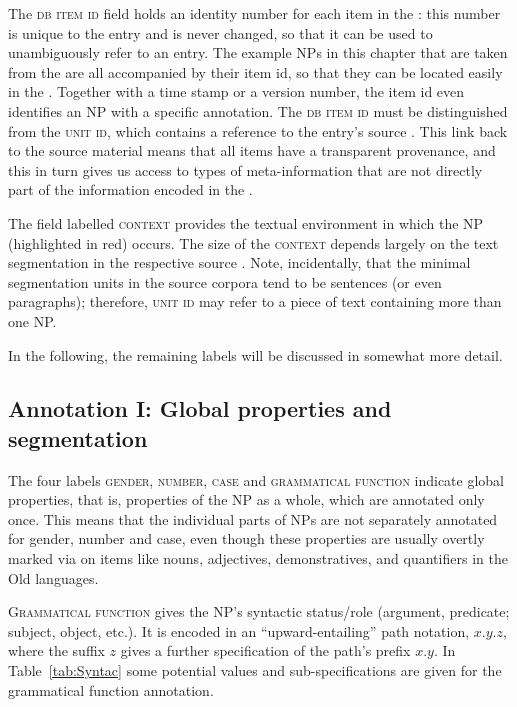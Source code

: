\documentclass[output=paper,colorlinks,citecolor=brown]{langscibook}
\begin{document}
The \textsc{db item id} field holds an identity number for each item in the : this number is unique to the entry and is never changed, so that it can be used to unambiguously refer to an entry. The example NPs in this chapter that are taken from the  are all accompanied by their item id, so that they can be located easily in the . Together with a time stamp or a  version number, the item id even identifies an NP with a specific annotation. The \textsc{db item id} must be distinguished from the \textsc{ unit id}, which contains a reference to the entry's source . This link back to the source material means that all items have a transparent provenance, and this in turn gives us access to types of meta-information that are not directly part of the information encoded in the . 

\largerpage
The field labelled \textsc{context} provides the textual environment in which the NP (highlighted in red) occurs. The size of the \textsc{context} depends largely on the text segmentation in the respective source . 
Note, incidentally, that the minimal segmentation units in the source corpora tend to be sentences (or even paragraphs); therefore,  \textsc{ unit id} may refer to a piece of text containing more than one NP.

In the following, the remaining labels will be discussed in somewhat more detail. 


\subsection{Annotation I: Global properties and segmentation}
\label{sec:anno1}

The four  labels \textsc{gender, number, case} and \textsc{grammatical function}  indicate global properties, that is, properties of the NP as a whole, which are annotated only once. This means that the individual parts of NPs are not separately annotated for gender, number and case, even though  these properties are usually overtly marked via   on items like nouns, adjectives, demonstratives, and quantifiers in the Old  languages.

\textsc{Grammatical function} gives the NP's syntactic status/role (argument, predicate; subject, object, etc.). It is encoded in an ``upward-entailing'' path notation, $x.y.z$, where the suffix $z$ gives a further specification of the path's prefix $x.y$. In Table~\ref{tab:Syntac} some potential values and sub-specifications are given for the grammatical function annotation.
\end{document}
